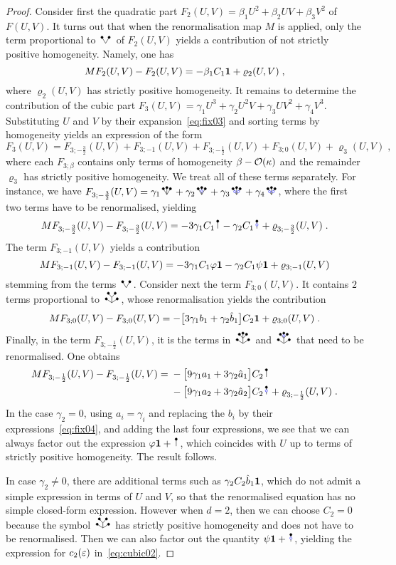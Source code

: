\documentclass[reqno,11pt]{article}
\def\unit{\vone}
\begin{document}
\begin{proof}
Consider first the quadratic part $F_2(U,V) = \beta_1U^2 + \beta_2UV +
\beta_3V^2$ of $F(U,V)$. It turns out that when the renormalisation map $M$ is
applied, only the term proportional to $\RSV$ of $F_2(U,V)$ yields a
contribution of not strictly positive homogeneity. Namely, one has 
\[
 M F_2(U,V) - F_2(U,V) =
-\beta_1C_1\unit
+\varrho_2(U,V)\;,
\]
where $\varrho_2(U,V)$ has strictly positive homogeneity.
It remains to determine the contribution of the cubic part $F_3(U,V) =
\gamma_1U^3+\gamma_2U^2V+\gamma_3UV^2+\gamma_4V^3$. Substituting $U$ and $V$ by
their expansion~\eqref{eq:fix03} and sorting terms by homogeneity yields an
expression of the form 
\[
 F_3(U,V) = F_{3;-\frac32}(U,V) + F_{3;-1}(U,V) + F_{3;-\frac12}(U,V) +
F_{3;0}(U,V) + \varrho_3(U,V)\;, 
\]
where each $F_{3;\beta}$ contains only terms of homogeneity
$\beta-{\mathcal O}(\kappa)$ and the remainder $\varrho_3$ has strictly positive
homogeneity. We treat all of these terms separately. For instance, we have 
$F_{3;-\frac32}(U,V) =
\gamma_1\RSW+\gamma_2\RSWo+\gamma_3\RSWoo+\gamma_4\RSWoo$, where the
first two terms have to be renormalised, yielding 
\[
 M F_{3;-\frac32}(U,V) - F_{3;-\frac32}(U,V) =
-3\gamma_1C_1\RSI 
-\gamma_2C_1\RSoI
+\varrho_{3;-\frac32}(U,V)\;.
\]
The term $F_{3;-1}(U,V)$ yields a contribution 
\[
 M F_{3;-1}(U,V) - F_{3;-1}(U,V) =
-3\gamma_1C_1\varphi\unit 
-\gamma_2C_1\psi\unit
+\varrho_{3;-1}(U,V)
\]
stemming from the terms $\RSV$. 
Consider next the term $F_{3;0}(U,V)$. It contains $2$ terms proportional to 
$\RSWV$, whose renormalisation yields the contribution 
\[
 M F_{3;0}(U,V) - F_{3;0}(U,V) = -\bigbrak{3\gamma_1 b_1 
 + \gamma_2 \hat b_1}C_2 \unit+\varrho_{3;0}(U,V)\;. 
\]
Finally, in the term $F_{3;-\frac12}(U,V)$, it is the terms in 
$\RSWW$ and $\RSWWo$ that need to be renormalised. One obtains 
\begin{align*}
 M F_{3;-\frac12}(U,V) - F_{3;-\frac12}(U,V) ={}&
-\bigbrak{9\gamma_1a_1 + 3 \gamma_2 \hat a_1}C_2\RSI \\
&{}-\bigbrak{9\gamma_1a_2 + 3\gamma_2\hat a_2}C_2\RSoI
+\varrho_{3;-\frac12}(U,V)\;.
\end{align*}
In the case $\gamma_2=0$, using $a_i=\gamma_i$ and replacing the $b_i$ by their
expressions~\eqref{eq:fix04}, and adding the last four expressions, we see that
we can always factor out the expression $\varphi\unit+\RSI$, which coincides
with $U$ up to terms of strictly positive homogeneity. 
The result follows. 

In case $\gamma_2\neq 0$, there are additional terms such as $\gamma_2 C_2 \hat
b_1\unit$, which do not admit a simple expression in terms of $U$ and $V$, so
that the renormalised equation has no simple closed-form expression. 
However when $d=2$, then we can choose $C_2=0$ because the symbol $\RSWV$
has strictly positive homogeneity and does not have to be renormalised. Then we
can also factor out the quantity $\psi\unit+\RSoI$, yielding the expression
for $c_2(\varepsilon)$ in~\eqref{eq:cubic02}.
\end{proof}
\end{document}
